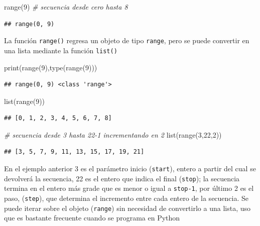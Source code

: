 \documentclass[
]{book}
\newenvironment{Shaded}{\begin{snugshade}}{\end{snugshade}}
\newcommand{\BuiltInTok}[1]{#1}
\newcommand{\CommentTok}[1]{\textcolor[rgb]{0.56,0.35,0.01}{\textit{#1}}}
\newcommand{\DecValTok}[1]{\textcolor[rgb]{0.00,0.00,0.81}{#1}}
\newcommand{\NormalTok}[1]{#1}
\theoremstyle{definition}
\theoremstyle{definition}
\theoremstyle{definition}
\theoremstyle{definition}
\theoremstyle{remark}
\begin{document}
\begin{Shaded}
\begin{Highlighting}[]
\BuiltInTok{range}\NormalTok{(}\DecValTok{9}\NormalTok{) }\CommentTok{\# secuencia desde cero hasta 8}
\end{Highlighting}
\end{Shaded}

\begin{verbatim}
## range(0, 9)
\end{verbatim}

La función \texttt{range()} regresa un objeto de tipo \texttt{range}, pero se puede convertir en una lista mediante la función \texttt{list()}

\begin{Shaded}
\begin{Highlighting}[]
\BuiltInTok{print}\NormalTok{(}\BuiltInTok{range}\NormalTok{(}\DecValTok{9}\NormalTok{),}\BuiltInTok{type}\NormalTok{(}\BuiltInTok{range}\NormalTok{(}\DecValTok{9}\NormalTok{)))}
\end{Highlighting}
\end{Shaded}

\begin{verbatim}
## range(0, 9) <class 'range'>
\end{verbatim}

\begin{Shaded}
\begin{Highlighting}[]
\BuiltInTok{list}\NormalTok{(}\BuiltInTok{range}\NormalTok{(}\DecValTok{9}\NormalTok{))}
\end{Highlighting}
\end{Shaded}

\begin{verbatim}
## [0, 1, 2, 3, 4, 5, 6, 7, 8]
\end{verbatim}

\begin{Shaded}
\begin{Highlighting}[]
\CommentTok{\# secuencia desde 3 hasta 22{-}1 incrementando en 2  }
\BuiltInTok{list}\NormalTok{(}\BuiltInTok{range}\NormalTok{(}\DecValTok{3}\NormalTok{,}\DecValTok{22}\NormalTok{,}\DecValTok{2}\NormalTok{)) }
\end{Highlighting}
\end{Shaded}

\begin{verbatim}
## [3, 5, 7, 9, 11, 13, 15, 17, 19, 21]
\end{verbatim}

En el ejemplo anterior 3 es el parámetro inicio (\texttt{start}), entero a partir del cual se devolverá la secuencia, 22 es el entero que indica el final (\texttt{stop}); la secuencia termina en el entero más grade que es menor o igual a \texttt{stop-1}, por último 2 es el paso, (\texttt{step}), que determina el incremento entre cada entero de la secuencia. Se puede iterar sobre el objeto (\texttt{range}) sin necesidad de convertirlo a una lista, uso que es bastante frecuente cuando se programa en Python
\end{document}
